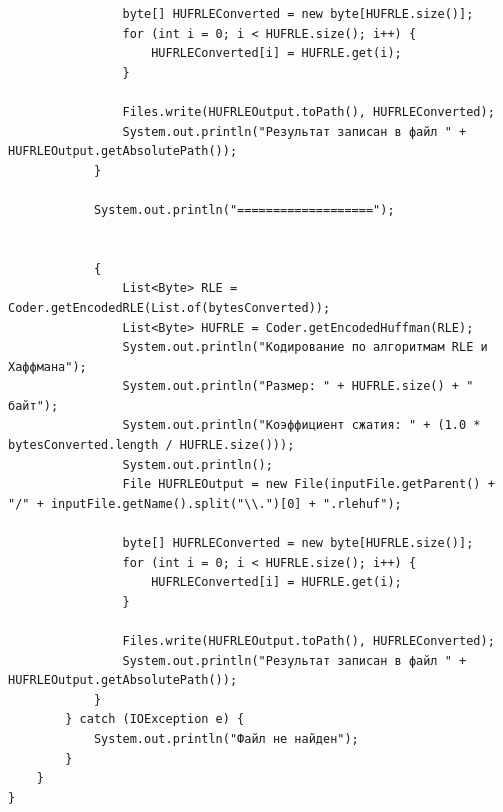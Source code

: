 \documentclass[a4paper,14pt]{extarticle}
\begin{document}
\begin{verbatim}
                byte[] HUFRLEConverted = new byte[HUFRLE.size()];
                for (int i = 0; i < HUFRLE.size(); i++) {
                    HUFRLEConverted[i] = HUFRLE.get(i);
                }

                Files.write(HUFRLEOutput.toPath(), HUFRLEConverted);
                System.out.println("Результат записан в файл " + HUFRLEOutput.getAbsolutePath());
            }

            System.out.println("===================");


            {
                List<Byte> RLE = Coder.getEncodedRLE(List.of(bytesConverted));
                List<Byte> HUFRLE = Coder.getEncodedHuffman(RLE);
                System.out.println("Кодирование по алгоритмам RLE и Хаффмана");
                System.out.println("Размер: " + HUFRLE.size() + " байт");
                System.out.println("Коэффициент сжатия: " + (1.0 * bytesConverted.length / HUFRLE.size()));
                System.out.println();
                File HUFRLEOutput = new File(inputFile.getParent() + "/" + inputFile.getName().split("\\.")[0] + ".rlehuf");

                byte[] HUFRLEConverted = new byte[HUFRLE.size()];
                for (int i = 0; i < HUFRLE.size(); i++) {
                    HUFRLEConverted[i] = HUFRLE.get(i);
                }

                Files.write(HUFRLEOutput.toPath(), HUFRLEConverted);
                System.out.println("Результат записан в файл " + HUFRLEOutput.getAbsolutePath());
            }
        } catch (IOException e) {
            System.out.println("Файл не найден");
        }
    }
}
\end{verbatim}
\end{document}
